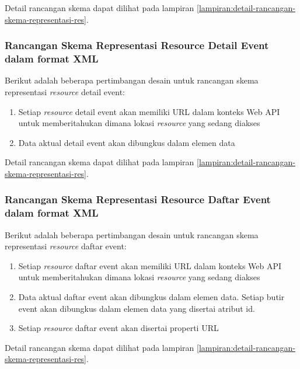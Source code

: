 \documentclass[a4paper, 12pt, oneside]{report}
\begin{document}
Detail rancangan skema dapat dilihat pada lampiran \ref{lampiran:detail-rancangan-skema-representasi-res}.

\subsubsection{Rancangan Skema Representasi Resource Detail Event dalam format XML}

\onehalfspacing Berikut adalah beberapa pertimbangan desain untuk rancangan skema representasi \textit{resource} detail event:

\begin{enumerate}
  \item Setiap \textit{resource} detail event akan memiliki URL dalam konteks Web API untuk memberitahukan dimana lokasi \textit{resource} yang sedang diakses
  \item Data aktual detail event akan dibungkus dalam elemen data
\end{enumerate}

Detail rancangan skema dapat dilihat pada lampiran \ref{lampiran:detail-rancangan-skema-representasi-res}.

\subsubsection{Rancangan Skema Representasi Resource Daftar Event dalam format XML}

\onehalfspacing Berikut adalah beberapa pertimbangan desain untuk rancangan skema representasi \textit{resource} daftar event:

\begin{enumerate}
  \item Setiap \textit{resource} daftar event akan memiliki URL dalam konteks Web API untuk memberitahukan dimana lokasi \textit{resource} yang sedang diakses
  \item Data aktual daftar event akan dibungkus dalam elemen data. Setiap butir event akan dibungkus dalam elemen data yang disertai atribut id.
\item Setiap \textit{resource} daftar event akan disertai properti URL
\end{enumerate}

Detail rancangan skema dapat dilihat pada lampiran \ref{lampiran:detail-rancangan-skema-representasi-res}.
\end{document}
